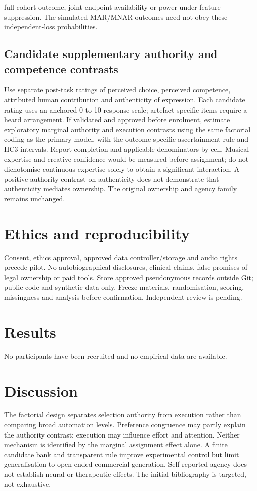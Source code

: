 \documentclass[11pt]{article}
\begin{document}
full-cohort outcome, joint endpoint availability or power under feature suppression. The simulated MAR/MNAR outcomes need not obey these independent-loss probabilities.

\subsection{Candidate supplementary authority and competence contrasts}
Use separate post-task ratings of perceived choice, perceived competence, attributed human contribution and authenticity of expression. Each candidate rating uses an anchored 0 to 10 response scale; artefact-specific items require a heard arrangement. If validated and approved before enrolment, estimate exploratory marginal authority and execution contrasts using the same factorial coding as the primary model, with the outcome-specific ascertainment rule and HC3 intervals. Report completion and applicable denominators by cell. Musical expertise and creative confidence would be measured before assignment; do not dichotomise continuous expertise solely to obtain a significant interaction. A positive authority contrast on authenticity does not demonstrate that authenticity mediates ownership. The original ownership and agency family remains unchanged.

\section{Ethics and reproducibility}
Consent, ethics approval, approved data controller/storage and audio rights precede pilot. No autobiographical disclosures, clinical claims, false promises of legal ownership or paid tools. Store approved pseudonymous records outside Git; public code and synthetic data only. Freeze materials, randomisation, scoring, missingness and analysis before confirmation. Independent review is pending.
\section{Results}
No participants have been recruited and no empirical data are available.
\section{Discussion}
The factorial design separates selection authority from execution rather than comparing broad automation levels. Preference congruence may partly explain the authority contrast; execution may influence effort and attention. Neither mechanism is identified by the marginal assignment effect alone. A finite candidate bank and transparent rule improve experimental control but limit generalisation to open-ended commercial generation. Self-reported agency does not establish neural or therapeutic effects. The initial bibliography is targeted, not exhaustive.

\printbibliography
\end{document}
